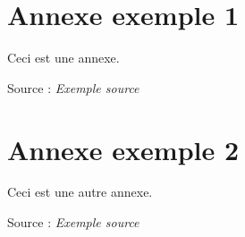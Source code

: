 \setcounter{section}{0}
\renewcommand{\thesection}{\Alph{section}}


\section{Annexe exemple 1}
Ceci est une annexe.
\begin{center}
    \label{fig:figure-example-annexe}
\end{center}
Source : \textit{Exemple source}
\newpage

\section{Annexe exemple 2}
Ceci est une autre annexe.
\begin{center}
    \label{fig:figure-example-annexe-2}
\end{center}
Source : \textit{Exemple source}
\newpage